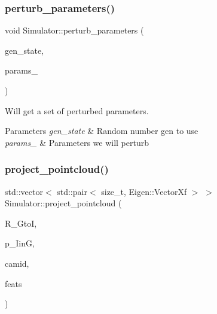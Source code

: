 \subsubsection{\texorpdfstring{perturb\+\_\+parameters()}{perturb\_parameters()}}
{\footnotesize\ttfamily void Simulator\+::perturb\+\_\+parameters (\begin{DoxyParamCaption}\item[{std\+::mt19937}]{gen\+\_\+state,  }\item[{\hyperlink{structov__msckf_1_1VioManagerOptions}{Vio\+Manager\+Options} \&}]{params\+\_\+ }\end{DoxyParamCaption})\hspace{0.3cm}{\ttfamily [static]}}



Will get a set of perturbed parameters. 


\begin{DoxyParams}{Parameters}
{\em gen\+\_\+state} & Random number gen to use \\
\hline
{\em params\+\_\+} & Parameters we will perturb \\
\hline
\end{DoxyParams}
\mbox{\label{classov__msckf_1_1Simulator_a1c6947099892bd64e2bad9b4c9303226}} 
\subsubsection{\texorpdfstring{project\+\_\+pointcloud()}{project\_pointcloud()}}
{\footnotesize\ttfamily std\+::vector$<$ std\+::pair$<$ size\+\_\+t, Eigen\+::\+Vector\+Xf $>$ $>$ Simulator\+::project\+\_\+pointcloud (\begin{DoxyParamCaption}\item[{const Eigen\+::\+Matrix3d \&}]{R\+\_\+\+GtoI,  }\item[{const Eigen\+::\+Vector3d \&}]{p\+\_\+\+IinG,  }\item[{int}]{camid,  }\item[{const std\+::unordered\+\_\+map$<$ size\+\_\+t, Eigen\+::\+Vector3d $>$ \&}]{feats }\end{DoxyParamCaption})\hspace{0.3cm}{\ttfamily [protected]}}



